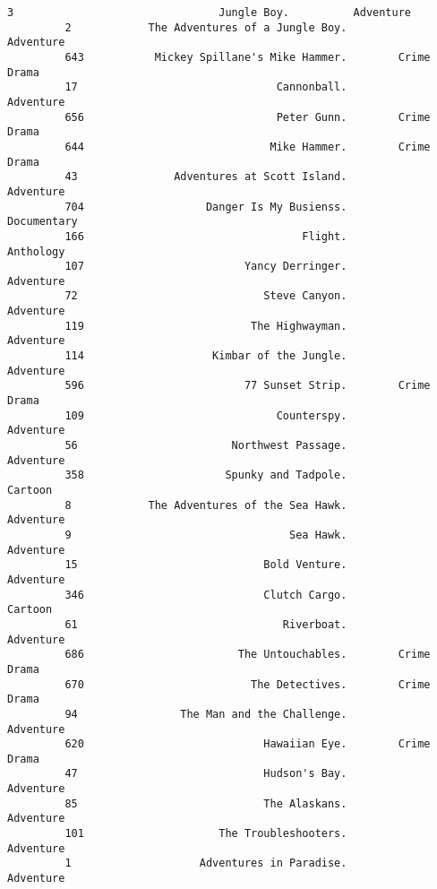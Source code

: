 \documentclass[11pt]{article}
\begin{document}
\begin{Verbatim}[commandchars=\\\{\}]
         3                                Jungle Boy.          Adventure   
         2            The Adventures of a Jungle Boy.          Adventure   
         643           Mickey Spillane's Mike Hammer.        Crime Drama   
         17                               Cannonball.          Adventure   
         656                              Peter Gunn.        Crime Drama   
         644                             Mike Hammer.        Crime Drama   
         43               Adventures at Scott Island.          Adventure   
         704                   Danger Is My Busienss.        Documentary   
         166                                  Flight.          Anthology   
         107                         Yancy Derringer.          Adventure   
         72                             Steve Canyon.          Adventure   
         119                          The Highwayman.          Adventure   
         114                    Kimbar of the Jungle.          Adventure   
         596                         77 Sunset Strip.        Crime Drama   
         109                              Counterspy.          Adventure   
         56                        Northwest Passage.          Adventure   
         358                      Spunky and Tadpole.            Cartoon   
         8            The Adventures of the Sea Hawk.          Adventure   
         9                                  Sea Hawk.          Adventure   
         15                             Bold Venture.          Adventure   
         346                            Clutch Cargo.            Cartoon   
         61                                Riverboat.          Adventure   
         686                        The Untouchables.        Crime Drama   
         670                          The Detectives.        Crime Drama   
         94                The Man and the Challenge.          Adventure   
         620                            Hawaiian Eye.        Crime Drama   
         47                             Hudson's Bay.          Adventure   
         85                             The Alaskans.          Adventure   
         101                     The Troubleshooters.          Adventure   
         1                    Adventures in Paradise.          Adventure   
         

\end{Verbatim}
\end{document}
